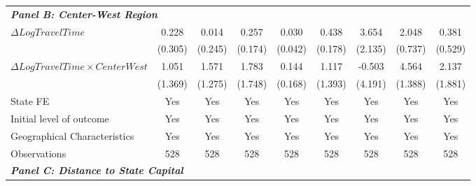 \begin{table}
{\begin{tabular}{l*{8}{c}}
\multicolumn{8}{l}{\linebreak \textbf{\textit{Panel B: Center-West Region}}} \\
$\Delta Log Travel Time$&       0.228         &       0.014         &       0.257         &       0.030         &       0.438\sym{**} &       3.654         &       2.048\sym{**} &       0.381         \\
&     (0.305)         &     (0.245)         &     (0.174)         &     (0.042)         &     (0.178)         &     (2.135)         &     (0.737)         &     (0.529)         \\
$\Delta Log Travel Time \times CenterWest$&       1.051         &       1.571         &       1.783         &       0.144         &       1.117         &      -0.503         &       4.564\sym{***}&       2.137         \\
&     (1.369)         &     (1.275)         &     (1.748)         &     (0.168)         &     (1.393)         &     (4.191)         &     (1.388)         &     (1.881)         \\

State FE            &         Yes         &         Yes         &         Yes         &         Yes         &         Yes         &         Yes         &         Yes         &         Yes         \\
Initial level of outcome&         Yes         &         Yes         &         Yes         &         Yes         &         Yes         &         Yes         &         Yes         &         Yes         \\
Geographical Characteristics&         Yes         &         Yes         &         Yes         &         Yes         &         Yes         &         Yes         &         Yes         &         Yes         \\
Observations        &         528         &         528         &         528         &         528         &         528         &         528         &         528         &         528         \\
\hline

\multicolumn{8}{l}{\linebreak \textbf{\textit{Panel C: Distance to State Capital}}} \\


\end{tabular}}
\end{table}
